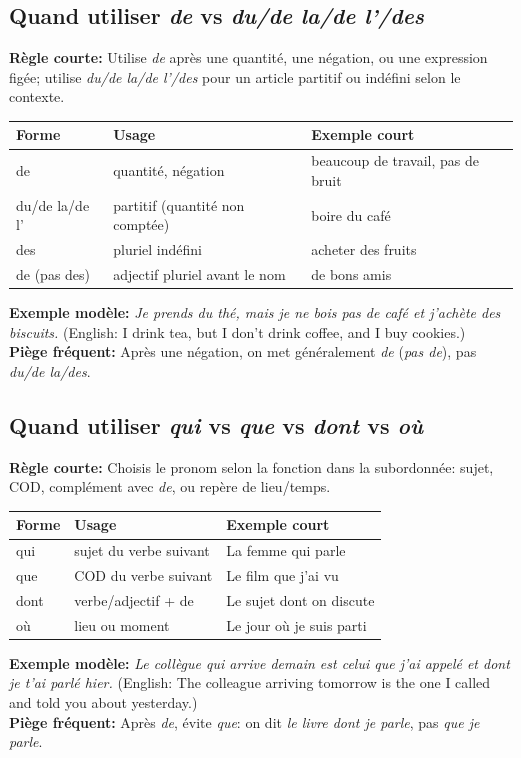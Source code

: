 \documentclass{article}
\begin{document}
\subsection{Quand utiliser \textit{de} vs \textit{du/de la/de l'/des}}
\textbf{Règle courte:} Utilise \textit{de} après une quantité, une négation, ou une expression figée; utilise \textit{du/de la/de l'/des} pour un article partitif ou indéfini selon le contexte.
\begin{center}
    \begin{tabular}{|l|l|l|}
        \hline
        \textbf{Forme} & \textbf{Usage} & \textbf{Exemple court} \\
        \hline
        de & quantité, négation & beaucoup de travail, pas de bruit \\
        \hline
        du/de la/de l' & partitif (quantité non comptée) & boire du café \\
        \hline
        des & pluriel indéfini & acheter des fruits \\
        \hline
        de (pas des) & adjectif pluriel avant le nom & de bons amis \\
        \hline
    \end{tabular}
\end{center}
\textbf{Exemple modèle:} \textit{Je prends du thé, mais je ne bois pas de café et j'achète des biscuits.} (English: I drink tea, but I don't drink coffee, and I buy cookies.) \\
\textbf{Piège fréquent:} Après une négation, on met généralement \textit{de} (\textit{pas de}), pas \textit{du/de la/des}.

\subsection{Quand utiliser \textit{qui} vs \textit{que} vs \textit{dont} vs \textit{où}}
\textbf{Règle courte:} Choisis le pronom selon la fonction dans la subordonnée: sujet, COD, complément avec \textit{de}, ou repère de lieu/temps.
\begin{center}
    \begin{tabular}{|l|l|l|}
        \hline
        \textbf{Forme} & \textbf{Usage} & \textbf{Exemple court} \\
        \hline
        qui & sujet du verbe suivant & La femme qui parle \\
        \hline
        que & COD du verbe suivant & Le film que j'ai vu \\
        \hline
        dont & verbe/adjectif + de & Le sujet dont on discute \\
        \hline
        où & lieu ou moment & Le jour où je suis parti \\
        \hline
    \end{tabular}
\end{center}
\textbf{Exemple modèle:} \textit{Le collègue qui arrive demain est celui que j'ai appelé et dont je t'ai parlé hier.} (English: The colleague arriving tomorrow is the one I called and told you about yesterday.) \\
\textbf{Piège fréquent:} Après \textit{de}, évite \textit{que}: on dit \textit{le livre dont je parle}, pas \textit{que je parle}.
\end{document}
